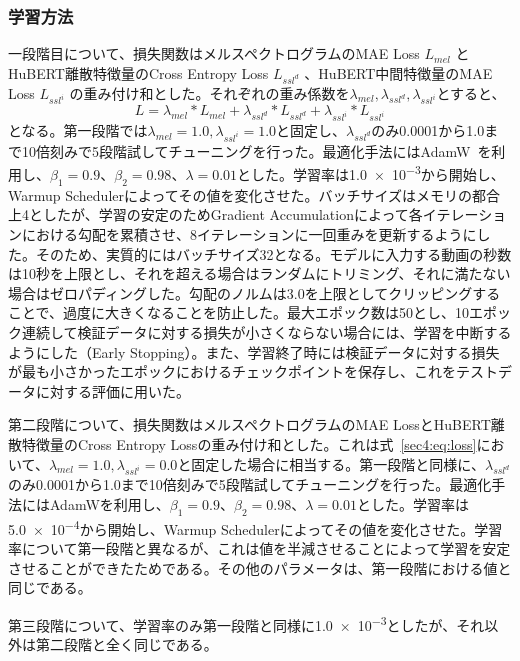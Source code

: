 \documentclass[12pt]{jarticle}
\numberwithin{equation}{section}    %
\numberwithin{figure}{section}      %
\numberwithin{table}{section}      %
\begin{document}
\subsubsection{学習方法}
一段階目について、損失関数はメルスペクトログラムのMAE Loss $L_{mel}$ とHuBERT離散特徴量のCross Entropy Loss $L_{ssl^{d}}$ 、HuBERT中間特徴量のMAE Loss $L_{ssl^{i}}$ の重み付け和とした。それぞれの重み係数を$\lambda_{mel}, \lambda_{ssl^{d}}, \lambda_{ssl^{i}}$とすると、
\begin{equation}
    \label{sec4:eq:loss}
    L = \lambda_{mel} * L_{mel} + \lambda_{ssl^{d}} * L_{ssl^{d}} + \lambda_{ssl^{i}} * L_{ssl^{i}}
\end{equation}
となる。第一段階では$\lambda_{mel} = 1.0, \lambda_{ssl^{i}} = 1.0$と固定し、$\lambda_{ssl^{d}}$のみ0.0001から1.0まで10倍刻みで5段階試してチューニングを行った。最適化手法にはAdamW~\cite{loshchilov2017decoupled}を利用し、$\beta_{1} = 0.9$、$\beta_{2} = 0.98$、$\lambda = 0.01$とした。学習率は\num{1.0e-3}から開始し、Warmup Schedulerによってその値を変化させた。バッチサイズはメモリの都合上4としたが、学習の安定のためGradient Accumulationによって各イテレーションにおける勾配を累積させ、8イテレーションに一回重みを更新するようにした。そのため、実質的にはバッチサイズ32となる。モデルに入力する動画の秒数は10秒を上限とし、それを超える場合はランダムにトリミング、それに満たない場合はゼロパディングした。勾配のノルムは3.0を上限としてクリッピングすることで、過度に大きくなることを防止した。最大エポック数は50とし、10エポック連続して検証データに対する損失が小さくならない場合には、学習を中断するようにした（Early Stopping）。また、学習終了時には検証データに対する損失が最も小さかったエポックにおけるチェックポイントを保存し、これをテストデータに対する評価に用いた。

第二段階について、損失関数はメルスペクトログラムのMAE LossとHuBERT離散特徴量のCross Entropy Lossの重み付け和とした。これは式~\eqref{sec4:eq:loss}において、$\lambda_{mel} = 1.0, \lambda_{ssl^{i}} = 0.0$と固定した場合に相当する。第一段階と同様に、$\lambda_{ssl^{d}}$のみ0.0001から1.0まで10倍刻みで5段階試してチューニングを行った。最適化手法にはAdamWを利用し、$\beta_{1} = 0.9$、$\beta_{2} = 0.98$、$\lambda = 0.01$とした。学習率は\num{5.0e-4}から開始し、Warmup Schedulerによってその値を変化させた。学習率について第一段階と異なるが、これは値を半減させることによって学習を安定させることができたためである。その他のパラメータは、第一段階における値と同じである。

第三段階について、学習率のみ第一段階と同様に\num{1.0e-3}としたが、それ以外は第二段階と全く同じである。
\end{document}
